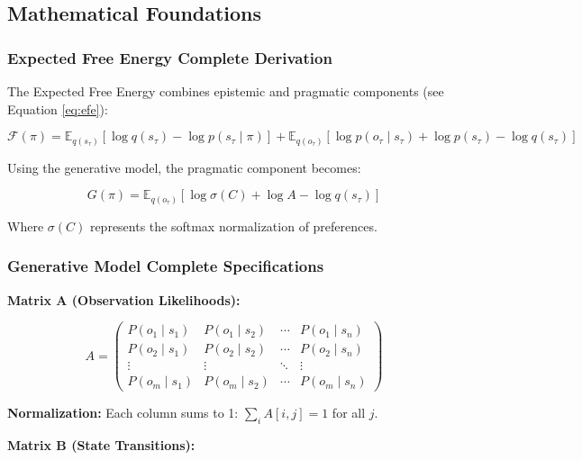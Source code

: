 \documentclass[
]{article}
\begin{document}
\subsection{Mathematical
Foundations}\label{sec:mathematical_foundations}

\subsubsection{Expected Free Energy Complete
Derivation}\label{expected-free-energy-complete-derivation}

The Expected Free Energy combines epistemic and pragmatic components
(see Equation \eqref{eq:efe}):

\begin{equation}
\mathcal{F}(\pi) = \mathbb{E}_{q(s_\tau)}[\log q(s_\tau) - \log p(s_\tau \mid \pi)] + \mathbb{E}_{q(o_\tau)}[\log p(o_\tau \mid s_\tau) + \log p(s_\tau) - \log q(s_\tau)]
\label{eq:efe_complete}
\end{equation}

Using the generative model, the pragmatic component becomes:

\begin{equation}
G(\pi) = \mathbb{E}_{q(o_\tau)}[\log \sigma(C) + \log A - \log q(s_\tau)]
\label{eq:pragmatic_generative}
\end{equation}

Where \(\sigma(C)\) represents the softmax normalization of preferences.

\subsubsection{Generative Model Complete
Specifications}\label{generative-model-complete-specifications}

\textbf{Matrix A (Observation Likelihoods):}

\[A = \begin{pmatrix}
P(o_1 \mid s_1) & P(o_1 \mid s_2) & \cdots & P(o_1 \mid s_n) \\
P(o_2 \mid s_1) & P(o_2 \mid s_2) & \cdots & P(o_2 \mid s_n) \\
\vdots & \vdots & \ddots & \vdots \\
P(o_m \mid s_1) & P(o_m \mid s_2) & \cdots & P(o_m \mid s_n)
\end{pmatrix}\]

\textbf{Normalization:} Each column sums to 1: \(\sum_i A[i,j] = 1\) for
all \(j\).

\textbf{Matrix B (State Transitions):}
\end{document}
